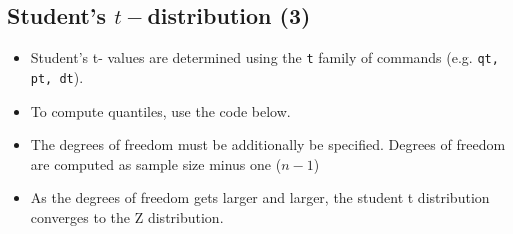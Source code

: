 %
%
%
%
%




\subsection{Student's $t-$distribution (3)}

\begin{itemize}
\item Student's t- values are determined using the \texttt{t} family of commands (e.g. \texttt{qt, pt, dt}).
\item To compute quantiles, use the code below.
\item The degrees of freedom must be additionally be specified. Degrees of freedom are computed as sample size minus one ($n-1$)
\item As the degrees of freedom gets larger and larger, the student t distribution converges to the Z distribution.

\end{itemize}

